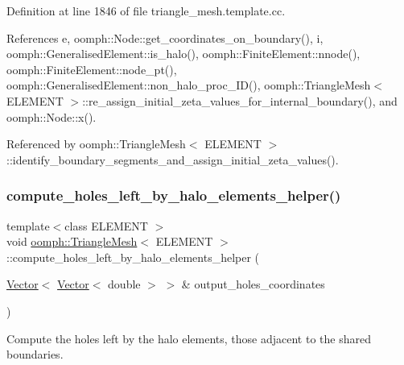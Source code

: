 Definition at line 1846 of file triangle\+\_\+mesh.\+template.\+cc.



References e, oomph\+::\+Node\+::get\+\_\+coordinates\+\_\+on\+\_\+boundary(), i, oomph\+::\+Generalised\+Element\+::is\+\_\+halo(), oomph\+::\+Finite\+Element\+::nnode(), oomph\+::\+Finite\+Element\+::node\+\_\+pt(), oomph\+::\+Generalised\+Element\+::non\+\_\+halo\+\_\+proc\+\_\+\+I\+D(), oomph\+::\+Triangle\+Mesh$<$ E\+L\+E\+M\+E\+N\+T $>$\+::re\+\_\+assign\+\_\+initial\+\_\+zeta\+\_\+values\+\_\+for\+\_\+internal\+\_\+boundary(), and oomph\+::\+Node\+::x().



Referenced by oomph\+::\+Triangle\+Mesh$<$ E\+L\+E\+M\+E\+N\+T $>$\+::identify\+\_\+boundary\+\_\+segments\+\_\+and\+\_\+assign\+\_\+initial\+\_\+zeta\+\_\+values().

\mbox{\label{classoomph_1_1TriangleMesh_a42ae047a452ed3bc897deabe2c188fcf}} 
\subsubsection{\texorpdfstring{compute\+\_\+holes\+\_\+left\+\_\+by\+\_\+halo\+\_\+elements\+\_\+helper()}{compute\_holes\_left\_by\_halo\_elements\_helper()}}
{\footnotesize\ttfamily template$<$class E\+L\+E\+M\+E\+NT $>$ \\
void \hyperlink{classoomph_1_1TriangleMesh}{oomph\+::\+Triangle\+Mesh}$<$ E\+L\+E\+M\+E\+NT $>$\+::compute\+\_\+holes\+\_\+left\+\_\+by\+\_\+halo\+\_\+elements\+\_\+helper (\begin{DoxyParamCaption}\item[{\hyperlink{classoomph_1_1Vector}{Vector}$<$ \hyperlink{classoomph_1_1Vector}{Vector}$<$ double $>$ $>$ \&}]{output\+\_\+holes\+\_\+coordinates }\end{DoxyParamCaption})\hspace{0.3cm}{\ttfamily [protected]}}



Compute the holes left by the halo elements, those adjacent to the shared boundaries. 



